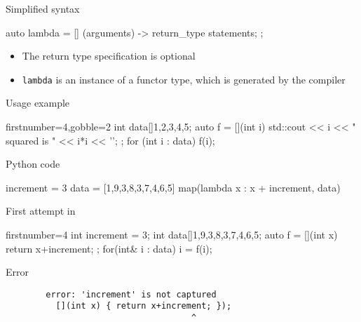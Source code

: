 \begin{frame}[fragile]
  \begin{block}{Simplified syntax}
    \begin{cppcode*}{}
      auto lambda = [] (arguments) -> return_type {
        statements;
      };
    \end{cppcode*}
    \begin{itemize}
    \item The return type specification is optional
    \item \texttt{lambda} is an instance of a functor type, which is generated by the compiler
    \end{itemize}
  \end{block}
  \begin{exampleblock}{Usage example}
    \begin{cppcode*}{firstnumber=4,gobble=2}
      int data[]{1,2,3,4,5};
      auto f = [](int i) {
        std::cout << i << " squared is " << i*i << '\n';
      };
      for (int i : data) f(i);
    \end{cppcode*}
  \end{exampleblock}
\end{frame}


\begin{frame}[fragile]
  \begin{block}{Python code}
    \begin{pythoncode*}{}
      increment = 3
      data = [1,9,3,8,3,7,4,6,5]
      map(lambda x : x + increment, data)
    \end{pythoncode*}
  \end{block}
  \pause
  \begin{block}{First attempt in \cpp}
    \begin{cppcode*}{firstnumber=4}
      int increment = 3;
      int data[]{1,9,3,8,3,7,4,6,5};
      auto f = [](int x) { return x+increment; };
      for(int& i : data) i = f(i);
    \end{cppcode*}
  \end{block}
  \pause
  \begin{alertblock}{Error}
    \begin{verbatim}
        error: 'increment' is not captured
          [](int x) { return x+increment; });
                                     ^
    \end{verbatim}
  \end{alertblock}
\end{frame}

